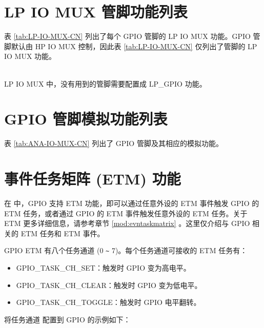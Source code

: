 \documentclass[main\_\_CN.tex]{subfiles}
\begin{document}
\section{LP IO MUX 管脚功能列表}
\label{sec:lp_iomux_pads}
表  \ref{tab:LP-IO-MUX-CN} 列出了每个 GPIO 管脚的 LP IO MUX 功能。GPIO 管脚默认由 HP IO MUX 控制，因此表 \ref{tab:LP-IO-MUX-CN} 仅列出了管脚的 LP IO MUX 功能。


\tableheaderLPFunctionsCN
\tablecontentLPFunctions

\begin{importantlisting}\\
    LP IO MUX 中，没有用到的管脚需要配置成 LP\_GPIO 功能。
\end{importantlisting}

\section{GPIO 管脚模拟功能列表}
\label{sec:analog_pins}
表 \ref{tab:ANA-IO-MUX-CN} 列出了 GPIO 管脚及其相应的模拟功能。


\tableheaderAnalogFunctionsCN
\tablecontentAnalogFunctions

\section{事件任务矩阵 (ETM) 功能}

在 \chipname{} 中，GPIO 支持 ETM 功能，即可以通过任意外设的 ETM 事件触发 GPIO 的 ETM 任务，或者通过 GPIO 的 ETM 事件触发任意外设的 ETM 任务。关于 ETM 更多详细信息，请参考章节 \ref{mod:evntaskmatrix} \textit{}。这里仅介绍与 GPIO 相关的 ETM 任务和 ETM 事件。

GPIO ETM 有八个任务通道  (0 \verb+~+ 7)。每个任务通道可接收的 ETM 任务有：

\begin{itemize}
    \item GPIO\_TASK\_CH\_SET：触发时 GPIO 变为高电平。
    \item GPIO\_TASK\_CH\_CLEAR：触发时 GPIO 变为低电平。
    \item GPIO\_TASK\_CH\_TOGGLE：触发时 GPIO 电平翻转。
\end{itemize}

将任务通道  配置到 GPIO 的示例如下：
\end{document}
